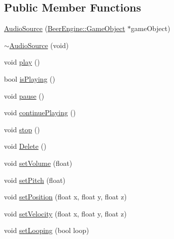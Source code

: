 \subsection*{Public Member Functions}
\begin{DoxyCompactItemize}
\item 
\mbox{\hyperlink{class_beer_engine_1_1_audio_1_1_audio_source_ae88acb0b42bec17ab0eb10c2b5a29296}{Audio\+Source}} (\mbox{\hyperlink{class_beer_engine_1_1_game_object}{Beer\+Engine\+::\+Game\+Object}} $\ast$game\+Object)
\item 
\mbox{\hyperlink{class_beer_engine_1_1_audio_1_1_audio_source_ab2c171ac2a239051dee8c22da0400683}{$\sim$\+Audio\+Source}} (void)
\item 
void \mbox{\hyperlink{class_beer_engine_1_1_audio_1_1_audio_source_a798250da977ddbbcc03ae35273a3386b}{play}} ()
\item 
bool \mbox{\hyperlink{class_beer_engine_1_1_audio_1_1_audio_source_af7acd0b50d499e9eb13ac649f5305acf}{is\+Playing}} ()
\item 
void \mbox{\hyperlink{class_beer_engine_1_1_audio_1_1_audio_source_a22271d00e2c9f6afded752b941fb35de}{pause}} ()
\item 
void \mbox{\hyperlink{class_beer_engine_1_1_audio_1_1_audio_source_a26d38a9a6e504074b9819416f4c9fa81}{continue\+Playing}} ()
\item 
void \mbox{\hyperlink{class_beer_engine_1_1_audio_1_1_audio_source_a7885411b2161b1b0f4bfbd87a97cd899}{stop}} ()
\item 
void \mbox{\hyperlink{class_beer_engine_1_1_audio_1_1_audio_source_ae1a09dee4b97025ef4506897c2eb3979}{Delete}} ()
\item 
void \mbox{\hyperlink{class_beer_engine_1_1_audio_1_1_audio_source_a0a31f1aaf01219860cc6aeb7a3fe1619}{set\+Volume}} (float)
\item 
void \mbox{\hyperlink{class_beer_engine_1_1_audio_1_1_audio_source_a4675732a9f75a2677a3f5d7b1a5b8beb}{set\+Pitch}} (float)
\item 
void \mbox{\hyperlink{class_beer_engine_1_1_audio_1_1_audio_source_a54f71bf26922c72815c892b7dc9c24b6}{set\+Position}} (float x, float y, float z)
\item 
void \mbox{\hyperlink{class_beer_engine_1_1_audio_1_1_audio_source_ae20d8df89f102910ed78acc2937a8433}{set\+Velocity}} (float x, float y, float z)
\item 
void \mbox{\hyperlink{class_beer_engine_1_1_audio_1_1_audio_source_aaab040b49f057f03f75be7dad2980ef0}{set\+Looping}} (bool loop)
\item 

\end{DoxyCompactItemize}
